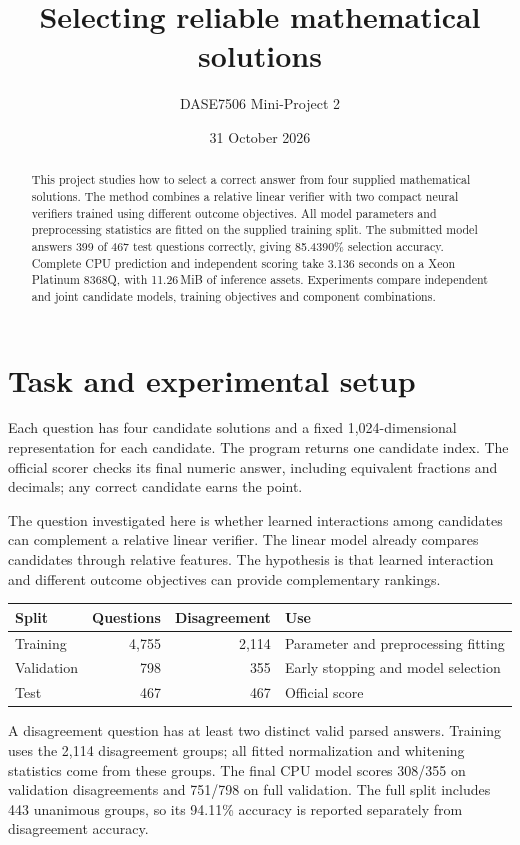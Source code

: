 \documentclass[11pt,a4paper]{article}
\title{Selecting reliable mathematical solutions}
\author{DASE7506 Mini-Project 2}
\date{31 October 2026}
\begin{document}
\maketitle
\begin{abstract}
This project studies how to select a correct answer from four supplied mathematical solutions. The method combines a relative linear verifier with two compact neural verifiers trained using different outcome objectives. All model parameters and preprocessing statistics are fitted on the supplied training split. The submitted model answers 399 of 467 test questions correctly, giving 85.4390\% selection accuracy. Complete CPU prediction and independent scoring take 3.136 seconds on a Xeon Platinum 8368Q, with 11.26\,MiB of inference assets. Experiments compare independent and joint candidate models, training objectives and component combinations.
\end{abstract}

\section{Task and experimental setup}

Each question has four candidate solutions and a fixed 1,024-dimensional representation for each candidate. The program returns one candidate index. The official scorer checks its final numeric answer, including equivalent fractions and decimals; any correct candidate earns the point.

The question investigated here is whether learned interactions among candidates can complement a relative linear verifier. The linear model already compares candidates through relative features. The hypothesis is that learned interaction and different outcome objectives can provide complementary rankings.

\begin{center}
\small
\begin{tabularx}{\linewidth}{lrrY}
\toprule
Split & Questions & Disagreement & Use \\
\midrule
Training & 4,755 & 2,114 & Parameter and preprocessing fitting \\
Validation & 798 & 355 & Early stopping and model selection \\
Test & 467 & 467 & Official score \\
\bottomrule
\end{tabularx}
\end{center}

A disagreement question has at least two distinct valid parsed answers. Training uses the 2,114 disagreement groups; all fitted normalization and whitening statistics come from these groups. The final CPU model scores 308/355 on validation disagreements and 751/798 on full validation. The full split includes 443 unanimous groups, so its 94.11\% accuracy is reported separately from disagreement accuracy.
\end{document}
